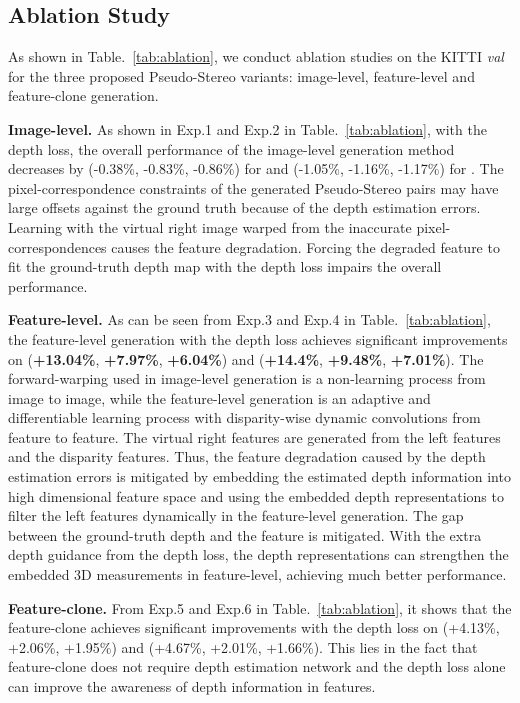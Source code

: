 \documentclass[10pt,twocolumn,letterpaper]{article}
\begin{document}
\subsection{Ablation Study}
As shown in Table.~\ref{tab:ablation}, we conduct ablation studies on the KITTI \emph{val} for the three proposed Pseudo-Stereo variants: image-level, feature-level and feature-clone generation. 


\noindent\textbf{Image-level.} As shown in Exp.1 and Exp.2 in Table.~\ref{tab:ablation}, with the depth loss, the overall performance of the image-level generation method decreases by (-0.38\%, -0.83\%, -0.86\%) for  and (-1.05\%, -1.16\%, -1.17\%) for . The pixel-correspondence constraints of the generated Pseudo-Stereo pairs may have large offsets against the ground truth because of the depth estimation errors. Learning with the virtual right image warped from the inaccurate pixel-correspondences causes the feature degradation. Forcing the degraded feature to 
fit the ground-truth depth map with the depth loss impairs the overall performance. 




\noindent\textbf{Feature-level.} As can be seen from Exp.3 and Exp.4 in Table.~\ref{tab:ablation}, the feature-level generation with the depth loss achieves significant improvements on  (\textbf{+13.04\%}, \textbf{+7.97\%}, \textbf{+6.04\%}) and  (\textbf{+14.4\%}, \textbf{+9.48\%}, \textbf{+7.01\%}). The forward-warping used in image-level generation is a non-learning process from image to image, while the feature-level generation is an adaptive and differentiable learning process with disparity-wise dynamic convolutions from feature to feature. The virtual right features are generated from the left features and the disparity features. Thus, the feature degradation caused by the depth estimation errors is mitigated by embedding the estimated depth information into high dimensional feature space and using the embedded depth representations to filter the left features dynamically in the feature-level generation. The gap between the ground-truth depth and the feature is mitigated. With the extra depth guidance from the depth loss, the depth representations can strengthen the embedded 3D measurements in feature-level, achieving much better performance.


\noindent\textbf{Feature-clone.} From Exp.5 and Exp.6 in Table.~\ref{tab:ablation}, it shows that the feature-clone achieves significant improvements with the depth loss on  (+4.13\%, +2.06\%, +1.95\%) and  (+4.67\%, +2.01\%, +1.66\%). This lies in the fact that feature-clone does not require depth estimation network and the depth loss alone can improve the awareness of depth information in features. 
\end{document}

